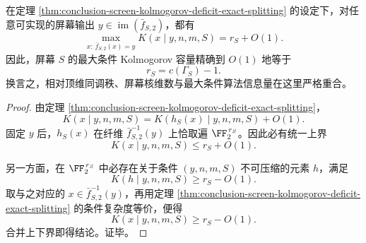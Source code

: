 \begin{corollary}[部分屏幕的最大条件复杂度恰等于其屏幕秩]\label{cor:conclusion-screen-max-conditional-complexity-equals-rank}
在定理 \ref{thm:conclusion-screen-kolmogorov-deficit-exact-splitting} 的设定下，对任意可实现的屏幕输出 \(y\in \operatorname{im}(\bar f_{S,2})\)，都有
\[
\max_{x:\,\bar f_{S,2}(x)=y} K(x\mid y,n,m,S)=r_S+O(1).
\]
因此，屏幕 \(S\) 的最大条件 Kolmogorov 容量精确到 \(O(1)\) 地等于
\[
r_S=c(\Gamma_S)-1.
\]
换言之，相对顶维同调秩、屏幕核维数与最大条件算法信息量在这里严格重合。
\end{corollary}

\begin{proof}
由定理 \ref{thm:conclusion-screen-kolmogorov-deficit-exact-splitting}，
\[
K(x\mid y,n,m,S)=K(h_S(x)\mid y,n,m,S)+O(1).
\]
固定 \(y\) 后，\(h_S(x)\) 在纤维 \(\bar f_{S,2}^{-1}(y)\) 上恰取遍 \(\FF_2^{\,r_S}\)。因此必有统一上界
\[
K(x\mid y,n,m,S)\le r_S+O(1).
\]

另一方面，在 \(\FF_2^{\,r_S}\) 中必存在关于条件 \((y,n,m,S)\) 不可压缩的元素 \(h\)，满足
\[
K(h\mid y,n,m,S)\ge r_S-O(1).
\]
取与之对应的 \(x\in \bar f_{S,2}^{-1}(y)\)，再用定理 \ref{thm:conclusion-screen-kolmogorov-deficit-exact-splitting} 的条件复杂度等价，便得
\[
K(x\mid y,n,m,S)\ge r_S-O(1).
\]
合并上下界即得结论。证毕。
\end{proof}

\endinput
